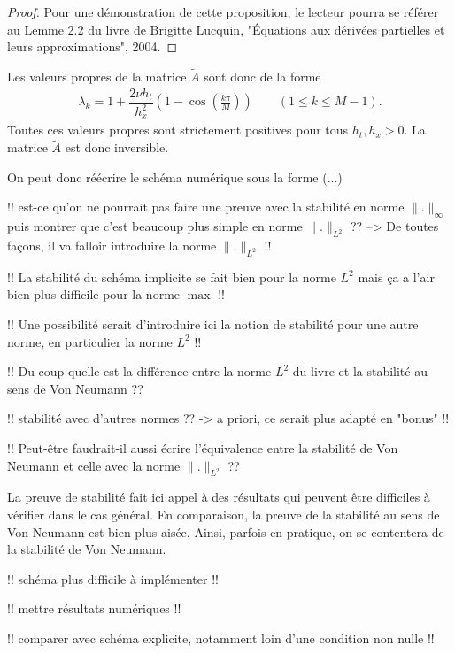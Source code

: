\documentclass[12pt,a4paper,twoside]{article}
\begin{document}
\begin{proof}
  Pour une d\'emonstration de cette proposition, le lecteur pourra se r\'ef\'erer au 
  Lemme 2.2 du livre 
  de Brigitte Lucquin, "\'Equations aux d\'eriv\'ees partielles et leurs approximations", 2004.
\end{proof}

Les valeurs propres de la matrice $\widetilde{A}$ sont donc de la forme
\begin{align*}
  \lambda_k = 1 + \dfrac{2 \nu h_t}{h_x^2} \left(1 - \cos \left(\frac{k \pi}{M} \right) \right)
  \qquad (1 \leq k \leq M-1) .
\end{align*}
Toutes ces valeurs propres sont strictement positives pour tous $h_t , h_x > 0$. 
La matrice $\widetilde{A}$ est donc inversible.


On peut donc r\'e\'ecrire le sch\'ema num\'erique sous la forme
(...)



!! est-ce qu'on ne pourrait pas faire une preuve avec la stabilit\'e en norme
$\| . \|_{\infty}$ puis montrer que c'est beaucoup plus simple
en norme $\| . \|_{L^2}$ ??
--> De toutes fa\c{c}ons, il va falloir introduire la norme $\|.\|_{L^2}$ !!

!! La stabilit\'e du sch\'ema implicite se fait bien pour la norme
$L^2$ mais \c{c}a a l'air bien plus difficile pour la norme $\max$ !!

!! Une possibilit\'e serait d'introduire ici la notion de stabilit\'e pour une autre
norme, en particulier la norme $L^2$ !!

!! Du coup quelle est la diff\'erence entre la norme $L^2$ du livre
et la stabilit\'e au sens de Von Neumann ??

!! stabilit\'e avec d'autres normes ?? -> a priori, ce serait plus adapt\'e
en "bonus" !!


!! Peut-\^etre faudrait-il aussi \'ecrire l'\'equivalence entre la stabilit\'e de
Von Neumann et celle avec la norme $\| . \|_{L^2}$ ??

\begin{remark}
  La preuve de stabilit\'e fait ici appel \`a des r\'esultats qui peuvent \^etre
  difficiles \`a v\'erifier dans le cas g\'en\'eral.
  En comparaison, la preuve de la stabilit\'e au sens de Von Neumann est bien plus ais\'ee.
  Ainsi, parfois en pratique, on se contentera de la stabilit\'e de Von Neumann.
\end{remark}


\begin{remark}
  !! sch\'ema plus difficile \`a impl\'ementer !!

  !! mettre r\'esultats num\'eriques !!

  !! comparer avec sch\'ema explicite, notamment loin d'une condition non nulle !!
\end{remark}
\end{document}
